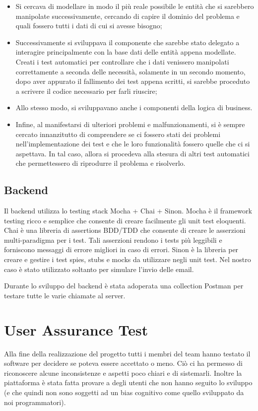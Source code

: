 \begin{itemize}

    \item Si cercava di modellare in modo il più reale possibile le entità che si sarebbero manipolate successivamente, cercando di capire il dominio del problema e quali fossero tutti i dati di cui si avesse bisogno;
    
    \item Successivamente si sviluppava il componente che sarebbe stato delegato a interagire principalmente con la base dati delle entità appena modellate. Creati i test automatici per controllare che i dati venissero manipolati correttamente a seconda delle necessità, solamente in un secondo momento, dopo aver appurato il fallimento dei test appena scritti, si sarebbe proceduto a scrivere il codice necessario per farli riuscire;
    
    \item Allo stesso modo, si sviluppavano anche i componenti della logica di business.
    
    \item Infine, al manifestarsi di ulteriori problemi e malfunzionamenti, si è sempre cercato innanzitutto di comprendere se ci fossero stati dei problemi nell'implementazione dei test e che le loro funzionalità fossero quelle che ci si aspettava. In tal caso, allora si procedeva alla stesura di altri test automatici che permettessero di riprodurre il problema e risolverlo.
    
\end{itemize}

 \subsection{Backend}
 Il backend utilizza lo testing stack Mocha + Chai + Sinon. 
Mocha è il framework testing ricco e semplice che consente di creare facilmente
gli unit test eloquenti.
Chai è una libreria di assertions BDD/TDD che consente di creare le asserzioni
multi-paradigma per i test. Tali asserzioni rendono i tests più leggibili e forniscono messaggi di errore migliori in caso di errori. 
Sinon è la libreria per creare e gestire i test spies, stubs e mocks da utilizzare
negli unit test. Nel nostro caso è stato utilizzato soltanto per simulare l'invio delle email.

Durante lo sviluppo del backend è stata adoperata una collection Postman per testare tutte le varie chiamate al server. 

\section{User Assurance Test}
Alla fine della realizzazione del progetto tutti i membri del team hanno testato il software per decidere se poteva essere accettato o meno. Ciò ci ha permesso di riconoscere alcune inconsistenze e aspetti poco chiari e di sistemarli. Inoltre la piattaforma è stata fatta provare a degli utenti che non
hanno seguito lo sviluppo (e che quindi non sono soggetti ad un bias cognitivo come
quello sviluppato da noi programmatori).